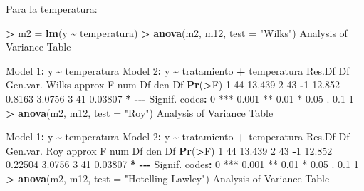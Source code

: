 \documentclass[
  a4paper,
  oneside]{scrbook}
\newenvironment{Shaded}{\begin{snugshade}}{\end{snugshade}}
\newcommand{\AttributeTok}[1]{\textcolor[rgb]{0.13,0.29,0.53}{#1}}
\newcommand{\DecValTok}[1]{\textcolor[rgb]{0.00,0.00,0.81}{#1}}
\newcommand{\FloatTok}[1]{\textcolor[rgb]{0.00,0.00,0.81}{#1}}
\newcommand{\FunctionTok}[1]{\textcolor[rgb]{0.13,0.29,0.53}{\textbf{#1}}}
\newcommand{\NormalTok}[1]{#1}
\newcommand{\OtherTok}[1]{\textcolor[rgb]{0.56,0.35,0.01}{#1}}
\newcommand{\SpecialCharTok}[1]{\textcolor[rgb]{0.81,0.36,0.00}{\textbf{#1}}}
\newcommand{\StringTok}[1]{\textcolor[rgb]{0.31,0.60,0.02}{#1}}
\theoremstyle{definition}
\theoremstyle{definition}
\theoremstyle{definition}
\theoremstyle{definition}
\theoremstyle{remark}
\begin{document}
\normalsize

Para la temperatura:

\footnotesize

\begin{Shaded}
\begin{Highlighting}[]
\SpecialCharTok{\textgreater{}}\NormalTok{ m2 }\OtherTok{=} \FunctionTok{lm}\NormalTok{(y }\SpecialCharTok{\textasciitilde{}}\NormalTok{ temperatura)}
\SpecialCharTok{\textgreater{}} \FunctionTok{anova}\NormalTok{(m2, m12, }\AttributeTok{test =} \StringTok{"Wilks"}\NormalTok{)}
\NormalTok{Analysis of Variance Table}

\NormalTok{Model }\DecValTok{1}\SpecialCharTok{:}\NormalTok{ y }\SpecialCharTok{\textasciitilde{}}\NormalTok{ temperatura}
\NormalTok{Model }\DecValTok{2}\SpecialCharTok{:}\NormalTok{ y }\SpecialCharTok{\textasciitilde{}}\NormalTok{ tratamiento }\SpecialCharTok{+}\NormalTok{ temperatura}
\NormalTok{  Res.Df Df Gen.var.  Wilks approx F num Df den Df  }\FunctionTok{Pr}\NormalTok{(}\SpecialCharTok{\textgreater{}}\NormalTok{F)  }
\DecValTok{1}     \DecValTok{44}      \FloatTok{13.439}                                        
\DecValTok{2}     \DecValTok{43} \SpecialCharTok{{-}}\DecValTok{1}   \FloatTok{12.852} \FloatTok{0.8163}   \FloatTok{3.0756}      \DecValTok{3}     \DecValTok{41} \FloatTok{0.03807} \SpecialCharTok{*}
\SpecialCharTok{{-}{-}{-}}
\NormalTok{Signif. codes}\SpecialCharTok{:}  \DecValTok{0} \StringTok{\textquotesingle{}***\textquotesingle{}} \FloatTok{0.001} \StringTok{\textquotesingle{}**\textquotesingle{}} \FloatTok{0.01} \StringTok{\textquotesingle{}*\textquotesingle{}} \FloatTok{0.05} \StringTok{\textquotesingle{}.\textquotesingle{}} \FloatTok{0.1} \StringTok{\textquotesingle{} \textquotesingle{}} \DecValTok{1}
\SpecialCharTok{\textgreater{}} \FunctionTok{anova}\NormalTok{(m2, m12, }\AttributeTok{test =} \StringTok{"Roy"}\NormalTok{)}
\NormalTok{Analysis of Variance Table}

\NormalTok{Model }\DecValTok{1}\SpecialCharTok{:}\NormalTok{ y }\SpecialCharTok{\textasciitilde{}}\NormalTok{ temperatura}
\NormalTok{Model }\DecValTok{2}\SpecialCharTok{:}\NormalTok{ y }\SpecialCharTok{\textasciitilde{}}\NormalTok{ tratamiento }\SpecialCharTok{+}\NormalTok{ temperatura}
\NormalTok{  Res.Df Df Gen.var.     Roy approx F num Df den Df  }\FunctionTok{Pr}\NormalTok{(}\SpecialCharTok{\textgreater{}}\NormalTok{F)  }
\DecValTok{1}     \DecValTok{44}      \FloatTok{13.439}                                         
\DecValTok{2}     \DecValTok{43} \SpecialCharTok{{-}}\DecValTok{1}   \FloatTok{12.852} \FloatTok{0.22504}   \FloatTok{3.0756}      \DecValTok{3}     \DecValTok{41} \FloatTok{0.03807} \SpecialCharTok{*}
\SpecialCharTok{{-}{-}{-}}
\NormalTok{Signif. codes}\SpecialCharTok{:}  \DecValTok{0} \StringTok{\textquotesingle{}***\textquotesingle{}} \FloatTok{0.001} \StringTok{\textquotesingle{}**\textquotesingle{}} \FloatTok{0.01} \StringTok{\textquotesingle{}*\textquotesingle{}} \FloatTok{0.05} \StringTok{\textquotesingle{}.\textquotesingle{}} \FloatTok{0.1} \StringTok{\textquotesingle{} \textquotesingle{}} \DecValTok{1}
\SpecialCharTok{\textgreater{}} \FunctionTok{anova}\NormalTok{(m2, m12, }\AttributeTok{test =} \StringTok{"Hotelling{-}Lawley"}\NormalTok{)}
\NormalTok{Analysis of Variance Table}


\end{Highlighting}
\end{Shaded}
\end{document}
